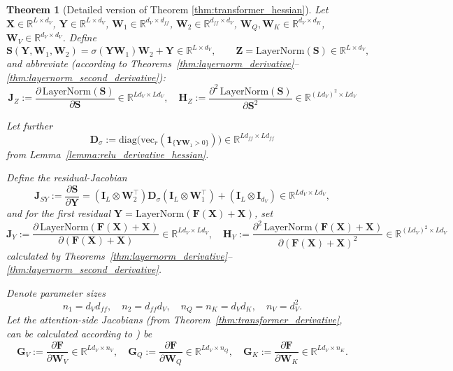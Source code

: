\documentclass{article}
\newtheorem{theorem}{Theorem} %
\begin{document}
\begin{theorem}[Detailed version of Theorem \ref{thm:transformer_hessian}]
Let $\mathbf{X} \in \mathbb{R}^{L \times d_V}$, $\mathbf{Y} \in \mathbb{R}^{L \times d_V}$, $\mathbf{W}_1 \in \mathbb{R}^{d_V \times d_{ff}}$, $\mathbf{W}_2 \in \mathbb{R}^{d_{ff} \times d_V}$, $\mathbf{W}_Q, \mathbf{W}_K \in \mathbb{R}^{d_V \times d_K}$, $\mathbf{W}_V \in \mathbb{R}^{d_V \times d_V}$.
Define
\[\mathbf{S}(\mathbf{Y},\mathbf{W}_1,\mathbf{W}_2) = \sigma(\mathbf{Y}\mathbf{W}_1)\mathbf{W}_2 + \mathbf{Y} \in \mathbb{R}^{L \times d_V}, \qquad\mathbf{Z} = \mathrm{LayerNorm}(\mathbf{S}) \in \mathbb{R}^{L \times d_V},\]
and abbreviate (according to  Theorems~\ref{thm:layernorm_derivative}--\ref{thm:layernorm_second_derivative}):
\[\mathbf{J}_Z := \frac{\partial\,\mathrm{LayerNorm}(\mathbf{S})}{\partial \mathbf{S}} \in \mathbb{R}^{L d_V \times L d_V}, \quad\mathbf{H}_Z := \frac{\partial^2\,\mathrm{LayerNorm}(\mathbf{S})}{\partial \mathbf{S}^2} \in \mathbb{R}^{(L d_V)^2 \times L d_V}\]

Let further
\[\mathbf{D}_\sigma := \mathrm{diag}\big(\mathrm{vec}_r(\mathbf{1}_{\{\mathbf{Y}\mathbf{W}_1>0\}})\big) \in \mathbb{R}^{L d_{ff} \times L d_{ff}}\]
from Lemma~\ref{lemma:relu_derivative_hessian}.

Define the residual-Jacobian
\[\mathbf{J}_{SY} := \frac{\partial \mathbf{S}}{\partial \mathbf{Y}} = (\mathbf{I}_L \otimes \mathbf{W}_2^\top)\mathbf{D}_\sigma (\mathbf{I}_L \otimes \mathbf{W}_1^\top) + (\mathbf{I}_L \otimes \mathbf{I}_{d_V}) \in \mathbb{R}^{L d_V \times L d_V},\]
and for the first residual $\mathbf{Y} = \mathrm{LayerNorm}(\mathbf{F}(\mathbf{X}) + \mathbf{X})$, set
\[\mathbf{J}_Y := \frac{\partial \,\mathrm{LayerNorm}(\mathbf{F}(\mathbf{X})+\mathbf{X})}{\partial (\mathbf{F}(\mathbf{X})+\mathbf{X})} \in \mathbb{R}^{L d_V \times L d_V}, \quad \mathbf{H}_Y := \frac{\partial^2 \,\mathrm{LayerNorm}(\mathbf{F}(\mathbf{X})+\mathbf{X})}{\partial (\mathbf{F}(\mathbf{X})+\mathbf{X})^2} \in \mathbb{R}^{(L d_V)^2 \times L d_V}\]
calculated by Theorems~\ref{thm:layernorm_derivative}--\ref{thm:layernorm_second_derivative}.

Denote parameter sizes
\[n_1 = d_V d_{ff},\quad n_2 = d_{ff} d_V,\quad n_Q = n_K = d_V d_K,\quad n_V = d_V^2.\]
Let the attention-side Jacobians (from Theorem~\ref{thm:transformer_derivative}, can be calculated according to \cite{noci2022signalpropagationtransformerstheoretical}) be
\[\mathbf{G}_V := \frac{\partial \mathbf{F}}{\partial \mathbf{W}_V} \in \mathbb{R}^{L d_V \times n_V}, \quad\mathbf{G}_Q := \frac{\partial \mathbf{F}}{\partial \mathbf{W}_Q} \in \mathbb{R}^{L d_V \times n_Q}, \quad\mathbf{G}_K := \frac{\partial \mathbf{F}}{\partial \mathbf{W}_K} \in \mathbb{R}^{L d_V \times n_K}.\]


\end{theorem}
\end{document}
